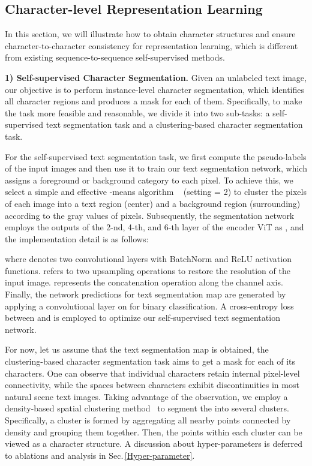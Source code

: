 \documentclass[10pt,twocolumn,letterpaper]{article}
\begin{document}
\subsection{Character-level Representation Learning}
In this section, we will illustrate how to obtain character structures and ensure character-to-character consistency for representation learning, which is different from existing sequence-to-sequence self-supervised methods.

\noindent \textbf{1) Self-supervised Character Segmentation.}\label{section:sec3.2.1}
Given an unlabeled text image, our objective is to perform instance-level character segmentation, which identifies all character regions and produces a mask for each of them.
Specifically, to make the task more feasible and reasonable, we divide it into two sub-tasks: a self-supervised text segmentation task and a clustering-based character segmentation task.

For the self-supervised text segmentation task, we first compute the pseudo-labels  of the input images and then use it to train our text segmentation network, which assigns a foreground or background category to each pixel.
To achieve this, we select a simple and effective -means algorithm ~\cite{hartigan1979algorithm} (setting  = 2) to cluster the pixels of each image into a text region (center) and a background
region (surrounding) according to the gray values of pixels. Subsequently, the segmentation network employs the outputs of the 2-nd, 4-th, and 6-th layer of the encoder ViT as , and the implementation detail is as follows:
{\setlength\abovedisplayskip{1pt}
\setlength\belowdisplayskip{1pt}
}

\noindent where  denotes two convolutional layers with BatchNorm and ReLU activation functions.
 refers to two  upsampling operations to restore the resolution of the input image.  represents the concatenation operation along the channel axis. 
Finally, the network predictions for text segmentation map  are generated by applying a convolutional layer on  for binary classification.
A cross-entropy loss  between  and  is employed to optimize our self-supervised text segmentation network. 

For now, let us assume that the text segmentation map  is obtained, the clustering-based character segmentation task aims to get a mask for each of its characters.
One can observe that individual characters retain internal pixel-level connectivity, while the spaces between characters exhibit discontinuities in most natural scene text images. Taking advantage of the observation, we employ a density-based spatial clustering method~\cite{DBSCAN} to
segment the  into several clusters. Specifically, a cluster is formed by aggregating all nearby points connected by density and grouping them together. 
Then, the points within each cluster can be viewed as a character structure. A discussion about hyper-parameters is deferred to ablations and analysis in Sec.\,\ref{Hyper-parameter}.
\end{document}
